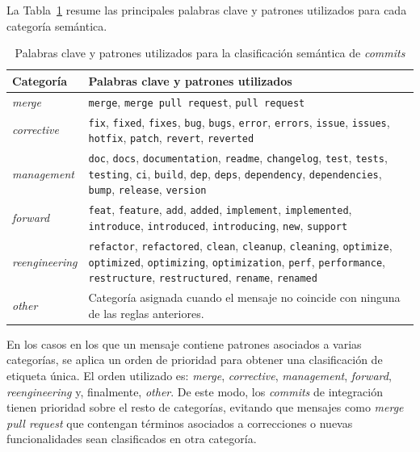 \documentclass[a4paper, 12pt]{book}
\begin{document}
La Tabla~\ref{tab:palabras_clave_clasificacion} resume las principales palabras clave y patrones utilizados para cada categoría semántica.

\begin{table}[H]
\centering
\small
\begin{tabular}{|p{3.2cm}|p{9.5cm}|}
\hline
\textbf{Categoría} & \textbf{Palabras clave y patrones utilizados} \\
\hline

\emph{merge} &
\texttt{merge}, \texttt{merge pull request}, \texttt{pull request} \\
\hline

\emph{corrective} &
\texttt{fix}, \texttt{fixed}, \texttt{fixes}, \texttt{bug}, \texttt{bugs}, \texttt{error}, \texttt{errors}, \texttt{issue}, \texttt{issues}, \texttt{hotfix}, \texttt{patch}, \texttt{revert}, \texttt{reverted} \\
\hline

\emph{management} &
\texttt{doc}, \texttt{docs}, \texttt{documentation}, \texttt{readme}, \texttt{changelog}, \texttt{test}, \texttt{tests}, \texttt{testing}, \texttt{ci}, \texttt{build}, \texttt{dep}, \texttt{deps}, \texttt{dependency}, \texttt{dependencies}, \texttt{bump}, \texttt{release}, \texttt{version} \\
\hline

\emph{forward} &
\texttt{feat}, \texttt{feature}, \texttt{add}, \texttt{added}, \texttt{implement}, \texttt{implemented}, \texttt{introduce}, \texttt{introduced}, \texttt{introducing}, \texttt{new}, \texttt{support} \\
\hline

\emph{reengineering} &
\texttt{refactor}, \texttt{refactored}, \texttt{clean}, \texttt{cleanup}, \texttt{cleaning}, \texttt{optimize}, \texttt{optimized}, \texttt{optimizing}, \texttt{optimization}, \texttt{perf}, \texttt{performance}, \texttt{restructure}, \texttt{restructured}, \texttt{rename}, \texttt{renamed} \\
\hline

\emph{other} &
Categoría asignada cuando el mensaje no coincide con ninguna de las reglas anteriores. \\
\hline

\end{tabular}
\caption{Palabras clave y patrones utilizados para la clasificación semántica de \emph{commits}}
\label{tab:palabras_clave_clasificacion}
\end{table}

En los casos en los que un mensaje contiene patrones asociados a varias categorías, se aplica un orden de prioridad para obtener una clasificación de etiqueta única. El orden utilizado es: \emph{merge}, \emph{corrective}, \emph{management}, \emph{forward}, \emph{reengineering} y, finalmente, \emph{other}. De este modo, los \emph{commits} de integración tienen prioridad sobre el resto de categorías, evitando que mensajes como \emph{merge pull request} que contengan términos asociados a correcciones o nuevas funcionalidades sean clasificados en otra categoría.
\end{document}

